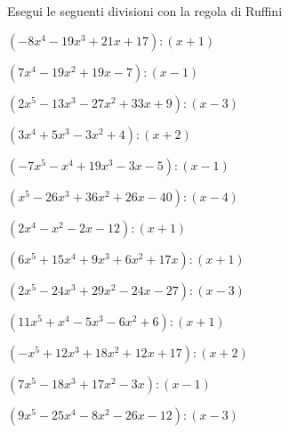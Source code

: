 \begin{esercizio}\label{ese:}
Esegui le seguenti divisioni con la regola di Ruffini
\begin{enumeratea}
\item  \(\left(-8 x^4 -19 x^3 +21 x +17 \right) : \left(x +1 \right)\)
\item  \(\left(7 x^4 -19 x^2 +19 x -7 \right) : \left(x -1 \right)\)
\item  \(\left(2 x^5 -13 x^3 -27 x^2 +33 x +9 \right) : 
    \left(x -3 \right)\)
\item  \(\left(3 x^4 +5 x^3 -3 x^2 +4 \right) : \left(x +2 \right)\)
\item  \(\left(-7 x^5 - x^4 +19 x^3 -3 x -5 \right) : \left(x -1 \right)\)
\item  \(\left(x^5 -26 x^3 +36 x^2 +26 x -40 \right) : 
    \left(x -4 \right)\)
\item  \(\left(2 x^4 - x^2 -2 x -12 \right) : \left(x +1 \right)\)
\item  \(\left(6 x^5 +15 x^4 +9 x^3 +6 x^2 +17 x  \right) : 
    \left(x +1 \right)\)
\item  \(\left(2 x^5 -24 x^3 +29 x^2 -24 x -27 \right) : 
    \left(x -3 \right)\)
\item  \(\left(11 x^5 + x^4 -5 x^3 -6 x^2 +6 \right) : \left(x +1 \right)\)
\item  \(\left(- x^5 +12 x^3 +18 x^2 +12 x +17 \right) : \left(x +2 \right)\)
\item  \(\left(7 x^5 -18 x^3 +17 x^2 -3 x  \right) : \left(x -1 \right)\)
\item  \(\left(9 x^5 -25 x^4 -8 x^2 -26 x -12 \right) : 
    \left(x -3 \right)\)

\end{enumeratea}
\end{esercizio}

